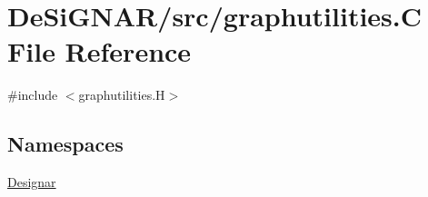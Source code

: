 \hypertarget{graphutilities_8_c}{}\section{De\+Si\+G\+N\+A\+R/src/graphutilities.C File Reference}
\label{graphutilities_8_c}
{\ttfamily \#include $<$graphutilities.\+H$>$}\newline
\subsection*{Namespaces}
\begin{DoxyCompactItemize}
\item 
 \hyperlink{namespace_designar}{Designar}
\end{DoxyCompactItemize}
